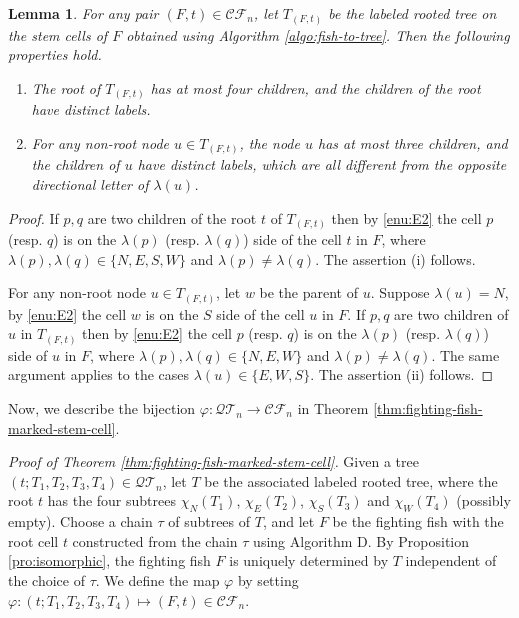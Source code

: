 \documentclass[a4paper,11pt,reqno]{amsart}
\newtheorem{lem}{Lemma}[section]
\theoremstyle{definition}
\numberwithin{equation}{section}
\newcommand{\CF}{{\mathcal{CF}}}
\newcommand{\QT}{{\mathcal{QT}}}
\begin{document}
\begin{lem} \label{lem:NESW-fish-tree}
For any pair $(F, t)\in\CF_n$, let $T_{(F,t)}$ be the labeled rooted tree on the stem cells of $F$ obtained using Algorithm \ref{algo:fish-to-tree}. Then the following properties hold.
\begin{enumerate}
\item The root of $T_{(F,t)}$ has at most four children, and the children of the root have distinct labels.
\item For any non-root node $u\in T_{(F,t)}$, the node $u$ has at most three children, and the children of $u$ have distinct labels, which are all different from the opposite directional letter of $\lambda(u)$.
\end{enumerate}
\end{lem}

\begin{proof} If $p,q$ are two children of the root $t$ of $T_{(F,t)}$ then by \ref{enu:E2} the cell $p$ (resp. $q$) is on the $\lambda(p)$ (resp. $\lambda(q)$) side of the cell $t$ in $F$, where $\lambda(p),\lambda(q)\in\{N,E,S,W\}$ and $\lambda(p)\neq\lambda(q)$. The assertion (i) follows.

For any non-root node $u\in T_{(F,t)}$, let $w$ be the parent of $u$. Suppose $\lambda(u)=N$, by \ref{enu:E2} the  cell $w$ is on the $S$ side of the cell $u$ in $F$. If $p,q$ are two children of $u$ in $T_{(F,t)}$ then by \ref{enu:E2} the cell $p$ (resp. $q$) is on the $\lambda(p)$ (resp. $\lambda(q)$) side of $u$ in $F$, where $\lambda(p),\lambda(q)\in\{N,E,W\}$ and $\lambda(p)\neq\lambda(q)$. The same argument applies to the cases $\lambda(u)\in\{E,W,S\}$. The assertion (ii) follows.
\end{proof}


\smallskip
Now, we describe the bijection $\varphi:\QT_n\rightarrow\CF_n$ in Theorem \ref{thm:fighting-fish-marked-stem-cell}.

\medskip 
\noindent
\emph{Proof of Theorem \ref{thm:fighting-fish-marked-stem-cell}.} 
Given a tree $(t;T_1,T_2,T_3,T_4)\in\QT_n$, let $T$ be the associated labeled rooted tree, where the root $t$ has the four subtrees ${\chi_N}(T_1)$, ${\chi_E}(T_2)$, ${\chi_S}(T_3)$ and ${\chi_W}(T_4)$ (possibly empty). Choose a chain $\tau$ of subtrees of $T$, and let $F$ be the fighting fish with the root cell $t$ constructed from the chain $\tau$ using Algorithm D. By Proposition \ref{pro:isomorphic}, the fighting fish $F$ is uniquely determined by $T$ independent of the choice of $\tau$. We define the map $\varphi$ by setting $\varphi:(t;T_1,T_2,T_3,T_4)\mapsto (F,t)\in\CF_n$.
\end{document}
